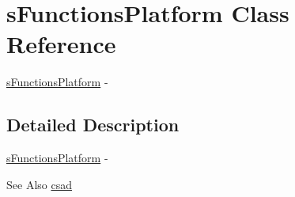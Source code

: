 \hypertarget{structs_functions_platform}{\section{s\-Functions\-Platform Class Reference}
\label{structs_functions_platform}
}


\hyperlink{structs_functions_platform}{s\-Functions\-Platform} -\/  




\subsection{Detailed Description}
\hyperlink{structs_functions_platform}{s\-Functions\-Platform} -\/ 

\begin{DoxySeeAlso}{See Also}
\hyperlink{namespacecsad}{csad} 
\end{DoxySeeAlso}
